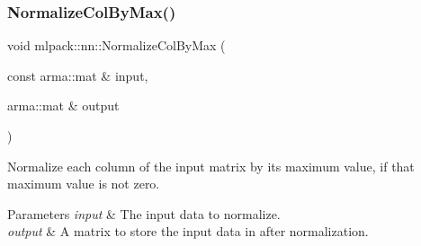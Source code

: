 \subsubsection{Normalize\+Col\+By\+Max()}
{\footnotesize\ttfamily void mlpack\+::nn\+::\+Normalize\+Col\+By\+Max (\begin{DoxyParamCaption}\item[{const arma\+::mat \&}]{input,  }\item[{arma\+::mat \&}]{output }\end{DoxyParamCaption})}



Normalize each column of the input matrix by its maximum value, if that maximum value is not zero. 


\begin{DoxyParams}{Parameters}
{\em input} & The input data to normalize. \\
\hline
{\em output} & A matrix to store the input data in after normalization. \\
\hline
\end{DoxyParams}
